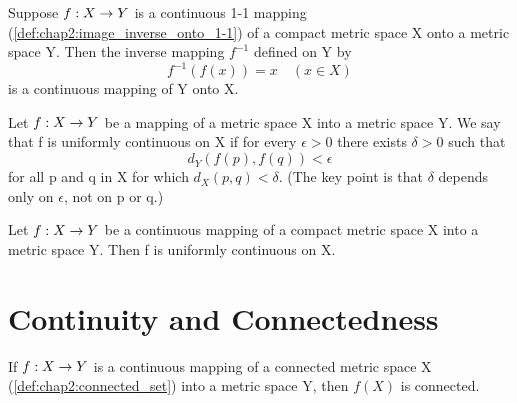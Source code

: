 
\begin{theorem} %
  \label{thm:chap4:continuous_inverse}
  Suppose $f: X \to Y$ is a continuous 1-1 mapping
  (\autoref{def:chap2:image_inverse_onto_1-1}) of a compact metric
  space X onto a metric space Y. Then the inverse mapping $f^{-1}$
  defined on Y by
  \[ f^{-1}(f(x)) = x \quad (x \in X) \]
  is a continuous mapping of Y onto X.
\end{theorem}

\begin{definition} %
  \label{def:chap4:uniform_continuity}
  Let $f: X \to Y$ be a mapping of a metric space X into a metric
  space Y. We say that f is uniformly continuous on X if for every
  $\epsilon > 0$ there exists $\delta > 0$ such that
  \[ d_Y(f(p), f(q)) < \epsilon \]
  for all p and q in X for which $d_X(p, q) < \delta$.
  (The key point is that $\delta$ depends only on $\epsilon$, not on p or q.)
\end{definition}

\begin{theorem}
  \label{thm:chap4:compact_implies_uniform_cont}
  Let $f: X \to Y$ be a continuous mapping of a compact metric
  space X into a metric space Y. Then f is uniformly continuous on X.
\end{theorem}



\section{Continuity and Connectedness}
\label{sec:chap4:cont_connected}

\begin{theorem} %
  \label{thm:chap4:image_connected_is_connected}
  If $f: X \to Y$ is a continuous mapping of a connected metric
  space X (\autoref{def:chap2:connected_set}) into a metric space Y,
  then $f(X)$ is connected.
\end{theorem}

